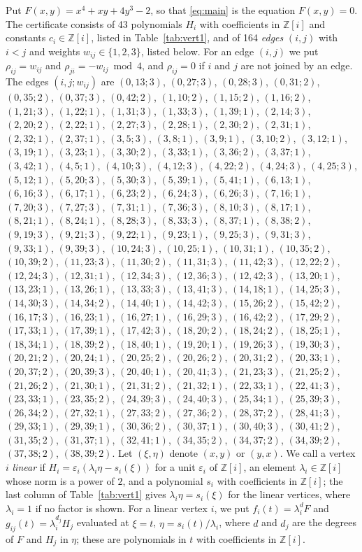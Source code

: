 \documentclass[11pt]{article}
\newcommand{\Z}{\mathbb{Z}}
\begin{document}
Put $F(x,y)=x^{4}+xy+4y^{3}-2$, so that \eqref{eq:main} is the equation $F(x,y)=0$. The certificate consists of 43 polynomials $H_i$ with coefficients in $\Z[i]$ and constants $c_i\in\Z[i]$, listed in Table~\ref{tab:vert1}, and of 164 \emph{edges} $(i,j)$ with $i<j$ and weights $w_{ij}\in\{1,2,3\}$, listed below. For an edge $(i,j)$ we put $\rho_{ij}=w_{ij}$ and $\rho_{ji}=-w_{ij}\bmod 4$, and $\rho_{ij}=0$ if $i$ and $j$ are not joined by an edge.
The edges $(i,j;w_{ij})$ are $(0,13;3)$, $(0,27;3)$, $(0,28;3)$, $(0,31;2)$, $(0,35;2)$, $(0,37;3)$, $(0,42;2)$, $(1,10;2)$, $(1,15;2)$, $(1,16;2)$, $(1,21;3)$, $(1,22;1)$, $(1,31;3)$, $(1,33;3)$, $(1,39;1)$, $(2,14;3)$, $(2,20;2)$, $(2,22;1)$, $(2,27;3)$, $(2,28;1)$, $(2,30;2)$, $(2,31;1)$, $(2,32;1)$, $(2,37;1)$, $(3,5;3)$, $(3,8;1)$, $(3,9;1)$, $(3,10;2)$, $(3,12;1)$, $(3,19;1)$, $(3,23;1)$, $(3,30;2)$, $(3,33;1)$, $(3,36;2)$, $(3,37;1)$, $(3,42;1)$, $(4,5;1)$, $(4,10;3)$, $(4,12;3)$, $(4,22;2)$, $(4,24;3)$, $(4,25;3)$, $(5,12;1)$, $(5,20;3)$, $(5,30;3)$, $(5,39;1)$, $(5,41;1)$, $(6,13;1)$, $(6,16;3)$, $(6,17;1)$, $(6,23;2)$, $(6,24;3)$, $(6,26;3)$, $(7,16;1)$, $(7,20;3)$, $(7,27;3)$, $(7,31;1)$, $(7,36;3)$, $(8,10;3)$, $(8,17;1)$, $(8,21;1)$, $(8,24;1)$, $(8,28;3)$, $(8,33;3)$, $(8,37;1)$, $(8,38;2)$, $(9,19;3)$, $(9,21;3)$, $(9,22;1)$, $(9,23;1)$, $(9,25;3)$, $(9,31;3)$, $(9,33;1)$, $(9,39;3)$, $(10,24;3)$, $(10,25;1)$, $(10,31;1)$, $(10,35;2)$, $(10,39;2)$, $(11,23;3)$, $(11,30;2)$, $(11,31;3)$, $(11,42;3)$, $(12,22;2)$, $(12,24;3)$, $(12,31;1)$, $(12,34;3)$, $(12,36;3)$, $(12,42;3)$, $(13,20;1)$, $(13,23;1)$, $(13,26;1)$, $(13,33;3)$, $(13,41;3)$, $(14,18;1)$, $(14,25;3)$, $(14,30;3)$, $(14,34;2)$, $(14,40;1)$, $(14,42;3)$, $(15,26;2)$, $(15,42;2)$, $(16,17;3)$, $(16,23;1)$, $(16,27;1)$, $(16,29;3)$, $(16,42;2)$, $(17,29;2)$, $(17,33;1)$, $(17,39;1)$, $(17,42;3)$, $(18,20;2)$, $(18,24;2)$, $(18,25;1)$, $(18,34;1)$, $(18,39;2)$, $(18,40;1)$, $(19,20;1)$, $(19,26;3)$, $(19,30;3)$, $(20,21;2)$, $(20,24;1)$, $(20,25;2)$, $(20,26;2)$, $(20,31;2)$, $(20,33;1)$, $(20,37;2)$, $(20,39;3)$, $(20,40;1)$, $(20,41;3)$, $(21,23;3)$, $(21,25;2)$, $(21,26;2)$, $(21,30;1)$, $(21,31;2)$, $(21,32;1)$, $(22,33;1)$, $(22,41;3)$, $(23,33;1)$, $(23,35;2)$, $(24,39;3)$, $(24,40;3)$, $(25,34;1)$, $(25,39;3)$, $(26,34;2)$, $(27,32;1)$, $(27,33;2)$, $(27,36;2)$, $(28,37;2)$, $(28,41;3)$, $(29,33;1)$, $(29,39;1)$, $(30,36;2)$, $(30,37;1)$, $(30,40;3)$, $(30,41;2)$, $(31,35;2)$, $(31,37;1)$, $(32,41;1)$, $(34,35;2)$, $(34,37;2)$, $(34,39;2)$, $(37,38;2)$, $(38,39;2)$.
Let $(\xi,\eta)$ denote $(x,y)$ or $(y,x)$. We call a vertex $i$ \emph{linear} if $H_i=\varepsilon_i(\lambda_i\eta-s_i(\xi))$ for a unit $\varepsilon_i$ of $\Z[i]$, an element $\lambda_i\in\Z[i]$ whose norm is a power of $2$, and a polynomial $s_i$ with coefficients in $\Z[i]$; the last column of Table~\ref{tab:vert1} gives $\lambda_i\eta=s_i(\xi)$ for the linear vertices, where $\lambda_i=1$ if no factor is shown. For a linear vertex $i$, we put $f_i(t)=\lambda_i^{d}F$ and $g_{ij}(t)=\lambda_i^{d_j}H_j$ evaluated at $\xi=t$, $\eta=s_i(t)/\lambda_i$, where $d$ and $d_j$ are the degrees of $F$ and $H_j$ in $\eta$; these are polynomials in $t$ with coefficients in $\Z[i]$.
\end{document}
